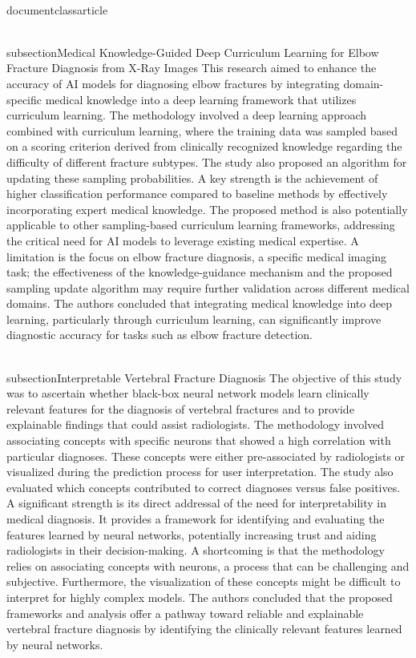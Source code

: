 \\documentclass{article}
\begin{document}
\\subsection{Medical Knowledge-Guided Deep Curriculum Learning for Elbow Fracture Diagnosis from X-Ray Images}
This research aimed to enhance the accuracy of AI models for diagnosing elbow fractures by integrating domain-specific medical knowledge into a deep learning framework that utilizes curriculum learning. The methodology involved a deep learning approach combined with curriculum learning, where the training data was sampled based on a scoring criterion derived from clinically recognized knowledge regarding the difficulty of different fracture subtypes. The study also proposed an algorithm for updating these sampling probabilities. A key strength is the achievement of higher classification performance compared to baseline methods by effectively incorporating expert medical knowledge. The proposed method is also potentially applicable to other sampling-based curriculum learning frameworks, addressing the critical need for AI models to leverage existing medical expertise. A limitation is the focus on elbow fracture diagnosis, a specific medical imaging task; the effectiveness of the knowledge-guidance mechanism and the proposed sampling update algorithm may require further validation across different medical domains. The authors concluded that integrating medical knowledge into deep learning, particularly through curriculum learning, can significantly improve diagnostic accuracy for tasks such as elbow fracture detection.

\\subsection{Interpretable Vertebral Fracture Diagnosis}
The objective of this study was to ascertain whether black-box neural network models learn clinically relevant features for the diagnosis of vertebral fractures and to provide explainable findings that could assist radiologists. The methodology involved associating concepts with specific neurons that showed a high correlation with particular diagnoses. These concepts were either pre-associated by radiologists or visualized during the prediction process for user interpretation. The study also evaluated which concepts contributed to correct diagnoses versus false positives. A significant strength is its direct addressal of the need for interpretability in medical diagnosis. It provides a framework for identifying and evaluating the features learned by neural networks, potentially increasing trust and aiding radiologists in their decision-making. A shortcoming is that the methodology relies on associating concepts with neurons, a process that can be challenging and subjective. Furthermore, the visualization of these concepts might be difficult to interpret for highly complex models. The authors concluded that the proposed frameworks and analysis offer a pathway toward reliable and explainable vertebral fracture diagnosis by identifying the clinically relevant features learned by neural networks.
\end{document}
